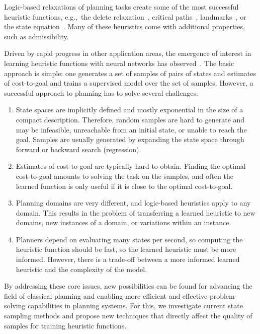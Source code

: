 Logic-based relaxations of planning tasks create some of the most successful heuristic functions, e.g.,~the delete relaxation~\cite{Hoffmann.Nebel/2001}, critical paths~\cite{haslum-geffner-aips2000}, landmarks~\cite{hoffmann-et-al-jair2004,Karpas.Domshlak/2009}, or the state equation~\cite{bonet-ijcai2013}. Many of these heuristics come with additional properties, such as admissibility.

Driven by rapid progress in other application areas, the emergence of interest in learning heuristic functions with neural networks has observed~\cite{samadi-et-al-aaai2008,Arfaee.etal/2011,Agostinelli.etal/2019,Yu.etal/2020,Shen.etal/2020,Ferber.etal/2020a,Toyer.etal/2020,Ferber.etal/2022,OToole/2022}. The basic approach is simple: one generates a set of samples of pairs of states and estimates of cost-to-goal and trains a supervised model over the set of samples. However, a successful approach to planning has to solve several challenges:

\begin{enumerate}[label=C\arabic*),left=0pt]
    \itemsep0pt
    \item State spaces are implicitly defined and mostly exponential in the size of a compact description. Therefore, random samples are hard to generate and may be infeasible, unreachable from an initial state, or unable to reach the goal. Samples are usually generated by expanding the state space through forward or backward search (regression).
    \item Estimates of cost-to-goal are typically hard to obtain. Finding the optimal cost-to-goal amounts to solving the task on the samples, and often the learned function is only useful if it is close to the optimal cost-to-goal.
    \item Planning domains are very different, and logic-based heuristics apply to any domain. This results in the problem of transferring a learned heuristic to new domains, new instances of a domain, or variations within an instance.
    \item Planners depend on evaluating many states per second, so computing the heuristic function should be fast, so the learned heuristic must be more informed. However, there is a trade-off between a more informed learned heuristic and the complexity of the model.
\end{enumerate}

By addressing these core issues, new possibilities can be found for advancing the field of classical planning and enabling more efficient and effective problem-solving capabilities in planning systems. For this, we investigate current state sampling methods and propose new techniques that directly affect the quality of samples for training heuristic functions.

